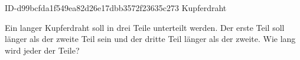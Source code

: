 \begin{exercise}
      {ID-d99bcfda1f549ea82d26e17dbb3572f23635c273}
      {Kupferdraht}
  \ifproblem\problem\par
    Ein   langer Kupferdraht soll in drei Teile
    unterteilt werden. Der erste Teil soll  länger als der
    zweite Teil sein und der dritte Teil  länger als der zweite.
    Wie lang wird jeder der Teile?
  \fi
\end{exercise}
